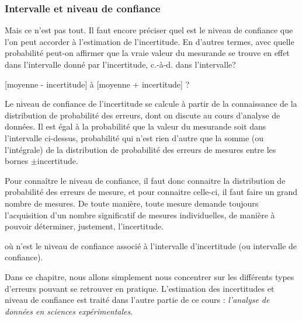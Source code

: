 \newpage

\subsubsection*{Intervalle et niveau de confiance}

Mais ce n'est pas tout. Il faut encore préciser quel est le niveau de confiance que l'on peut accorder à l'estimation de l'incertitude. En d'autres termes, avec quelle probabilité peut-on affirmer que la vraie valeur du mesurande se trouve en effet dans l'intervalle donné par l'incertitude, c.-à-d. dans l'intervalle?
\begin{center}
    [moyenne - incertitude] à [moyenne + incertitude] ?
\end{center}
Le niveau de confiance de l'incertitude se calcule à partir de la connaissance de la distribution de probabilité des erreurs, dont on discute au cours d'analyse de données. Il est égal à la probabilité que la valeur du mesurande soit dans l'intervalle ci-dessus, probabilité qui n'est rien d'autre que la somme (ou l'intégrale) de la distribution de probabilité des erreurs de mesures entre les bornes $\pm$incertitude.

Pour connaître le niveau de confiance, il faut donc connaitre la distribution de probabilité des erreurs de mesure, et pour connaitre celle-ci, il faut faire un grand nombre de mesures. De toute manière, toute mesure demande toujours l'acquisition d'un nombre significatif de mesures individuelles, de manière à pouvoir déterminer, justement, l'incertitude.

\begin{center}
\end{center}
où n'est le niveau de confiance associé à l'intervalle d'incertitude (ou intervalle de confiance).


Dans ce chapitre, nous allons simplement nous concentrer sur les différents types d'erreurs pouvant se retrouver en pratique. L'estimation des incertitudes et niveau de confiance est traité dans l'autre partie de ce cours : \textit{l'analyse de données en sciences expérimentales}.

